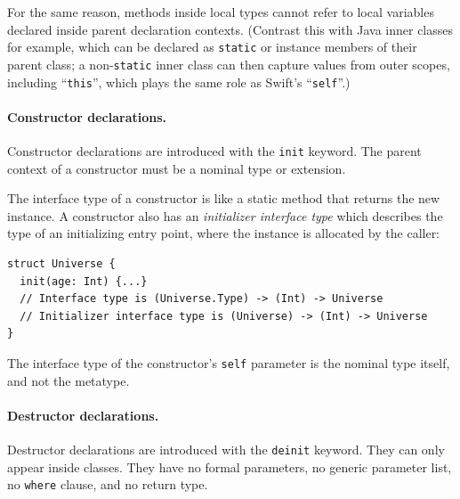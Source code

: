 \documentclass[../generics]{subfiles}
\begin{document}
For the same reason, methods inside local types cannot refer to local variables declared inside parent declaration contexts. (Contrast this with Java inner classes for example, which can be declared as \texttt{static} or instance members of their parent class; a non-\texttt{static} inner class can then capture values from outer scopes, including ``\texttt{this}'', which plays the same role as Swift's ``\texttt{self}''.)

\paragraph{Constructor declarations.}
Constructor declarations are introduced with the \texttt{init} keyword. The parent context of a constructor must be a nominal type or extension.

The interface type of a constructor is like a static method that returns the new instance. A constructor also has an \emph{initializer interface type} which describes the type of an initializing entry point, where the instance is allocated by the caller:
\begin{Verbatim}
struct Universe {
  init(age: Int) {...}
  // Interface type is (Universe.Type) -> (Int) -> Universe
  // Initializer interface type is (Universe) -> (Int) -> Universe
}
\end{Verbatim}
The interface type of the constructor's \texttt{self} parameter is the nominal type itself, and not the metatype.

\paragraph{Destructor declarations.}
Destructor declarations are introduced with the \texttt{deinit} keyword. They can only appear inside classes. They have no formal parameters, no generic parameter list, no \texttt{where} clause, and no return type.
\end{document}
